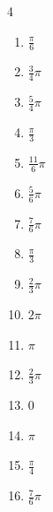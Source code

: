\begin{multicols}{4}
\begin{enumerate}
  \item $\displaystyle \frac{\pi}{6}$

  \item $\displaystyle \frac{3}{4}\pi$

\columnbreak %

  \item $\displaystyle \frac{5}{4}\pi$

  \item $\displaystyle \frac{\pi}{3}$

  \item $\displaystyle \frac{11}{6}\pi$

  \item $\displaystyle \frac{5}{6}\pi$

  \item $\displaystyle \frac{7}{6}\pi$

  \item $\displaystyle \frac{\pi}{3}$

  \item $\displaystyle \frac{2}{3}\pi$

  \item $\displaystyle 2\pi$

  \item $\displaystyle \pi$

  \item $\displaystyle \frac{2}{3}\pi$

  \item $\displaystyle 0$

  \item $\displaystyle \pi$

  \item $\displaystyle \frac{\pi}{4}$

  \item $\displaystyle \frac{7}{6}\pi$


\end{enumerate}
\end{multicols}
